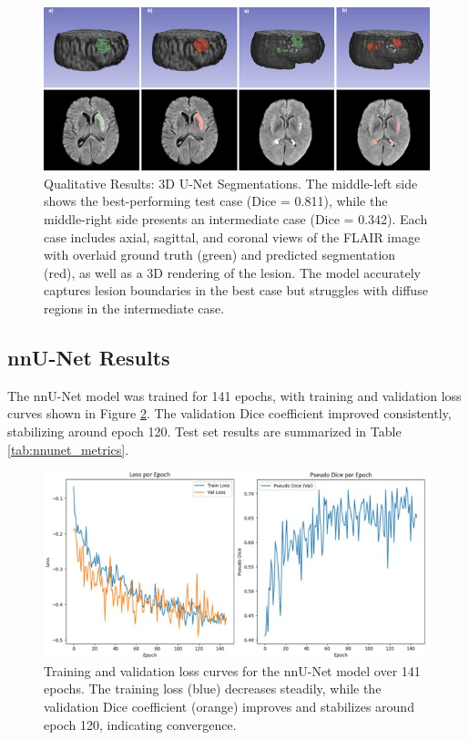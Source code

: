 \documentclass[12pt]{article}
\begin{document}
\begin{figure}[tp]
    \centering
    \includegraphics[width=\textwidth]{figures/Figure 2.jpg}
    \caption{Qualitative Results: 3D U-Net Segmentations. The middle-left side shows the best-performing test case (Dice = 0.811), while the middle-right side presents an intermediate case (Dice = 0.342). Each case includes axial, sagittal, and coronal views of the FLAIR image with overlaid ground truth (green) and predicted segmentation (red), as well as a 3D rendering of the lesion. The model accurately captures lesion boundaries in the best case but struggles with diffuse regions in the intermediate case.}
    \label{fig:unet_qualitative}
\end{figure}


\subsection{nnU-Net Results} \label{subsec:nnu-net}  

The nnU-Net model was trained for 141 epochs, with training and validation loss curves shown in Figure \ref{fig:nnu-net_loss_curve}. The validation Dice coefficient improved consistently, stabilizing around epoch 120. Test set results are summarized in Table \ref{tab:nnunet_metrics}.

\begin{figure}[tp]
    \centering
    \includegraphics[width=\textwidth]{figures/Figure 3.jpg}
    \caption{Training and validation loss curves for the nnU-Net model over 141 epochs. The training loss (blue) decreases steadily, while the validation Dice coefficient (orange) improves and stabilizes around epoch 120, indicating convergence.}
    \label{fig:nnu-net_loss_curve}
\end{figure}
\end{document}
